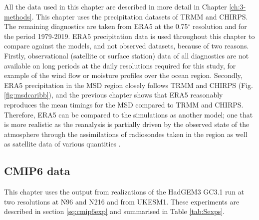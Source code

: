 All the data used in this chapter are described in more detail in Chapter \ref{ch:3-methods}. This chapter uses the precipitation datasets of TRMM and CHIRPS. The remaining diagnostics are taken from ERA5 at the 0.75$^\circ$ resolution and for the period 1979-2019. ERA5 precipitation data is used throughout this chapter to compare against the models, and not observed datasets, because of two reasons. Firstly, observational (satellite or surface station) data of all diagnostics are not available on long periods at the daily resolutions required for this study, for example of the wind flow or moisture profiles over the ocean region. Secondly, ERA5 precipitation in the MSD region closely follows TRMM and CHIRPS (Fig. \ref{fig:msdcaribb}), and the previous chapter shows that ERA5 reasonably reproduces the mean timings for the MSD compared to TRMM and CHIRPS. Therefore, ERA5 can be compared to the simulations as another model; one that is more realistic as the reanalysis is partially driven by the observed state of the atmosphere through the assimilations of radiosondes taken in the region as well as satellite data of various quantities \citep{era5hersbach}.

\subsection{CMIP6 data}\label{sq:ch6cmipdata}

This chapter uses the output from realizations of the HadGEM3 GC3.1 run at two resolutions at N96 and N216 and from UKESM1. These experiments are described in section \ref{sq:cmip6exp} and summarised in Table \ref{tab:Sexps}.


